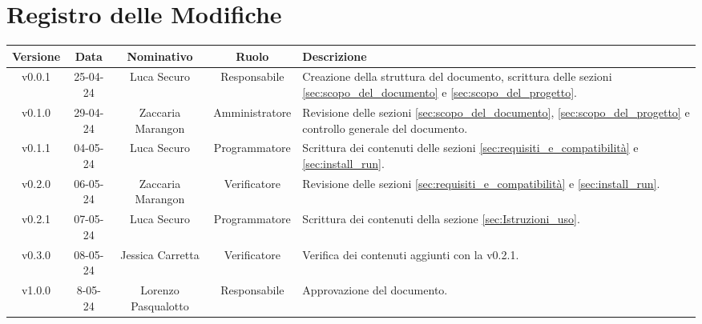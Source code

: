 \section*{\Large Registro delle Modifiche}
    \begin{table}[h]
        \centering
        \renewcommand\tabularxcolumn[1]{m{#1}} %
        \renewcommand{\arraystretch}{1.5}
        \begin{tabularx}{0.98\textwidth}
            {c|c|c|c|>{\centering\arraybackslash}X}
            \rowcolor{black}
            \textbf{\color{white} Versione} & \textbf{\color{white} Data} & \textbf{\color{white} Nominativo} & \textbf{\color{white} Ruolo} & \textbf{\color{white} Descrizione} \\ 
            \hline

            v0.0.1 & 25-04-24 & Luca Securo & Responsabile & Creazione della struttura del documento, scrittura delle sezioni \ref{sec:scopo_del_documento} e \ref{sec:scopo_del_progetto}.\\
            v0.1.0 & 29-04-24 & Zaccaria Marangon & Amministratore & Revisione delle sezioni \ref{sec:scopo_del_documento}, \ref{sec:scopo_del_progetto} e controllo generale del documento.\\
            v0.1.1 & 04-05-24 & Luca Securo & Programmatore & Scrittura dei contenuti delle sezioni \ref{sec:requisiti_e_compatibilità} e \ref{sec:install_run}.\\
            v0.2.0 & 06-05-24 & Zaccaria Marangon & Verificatore & Revisione delle sezioni \ref{sec:requisiti_e_compatibilità} e \ref{sec:install_run}.\\
            v0.2.1 & 07-05-24 & Luca Securo & Programmatore & Scrittura dei contenuti della sezione \ref{sec:Istruzioni_uso}.\\
            v0.3.0 & 08-05-24 & Jessica Carretta & Verificatore & Verifica dei contenuti aggiunti con la v0.2.1.\\
            v1.0.0 & 8-05-24 & Lorenzo Pasqualotto & Responsabile& Approvazione del documento.\\
            
            \hline
        \end{tabularx}
    \end{table}